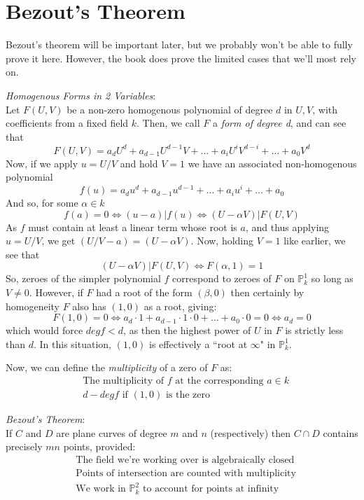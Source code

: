 \section{Bezout's Theorem}
Bezout's theorem will be important later, but we
probably won't be able to fully prove it here. However,
the book does prove the limited cases that we'll most rely on.

\begin{theorem}
\emph{Homogenous Forms in 2 Variables}:\\

Let $F(U,V)$ be a non-zero homogenous polynomial of degree $d$ in $U,V$,
with coefficients from a fixed field $k$. Then, we call $F$ a \emph{form of degree d},
and can see that
\[
F(U,V) = a_dU^d+a_{d-1}U^{d-1}V + \dots + a_iU^iV^{d-i}+\dots+a_0V^d
\]
Now, if we apply $u=U/V$ and hold $V=1$ we have an associated non-homogenous polynomial
\[
f(u) = a_du^d + a_{d-1}u^{d-1} + \dots + a_iu^i + \dots + a_0
\]
And so, for some $\alpha \in k$
\[ %
f(a) = 0 \iff (u-a)|f(u) \iff (U-\alpha V) | F(U,V)
\]
As $f$ must contain at least a linear term whose root is $a$, and
thus applying $u=U/V$, we get $(U/V - a) = (U - \alpha V)$. Now, 
holding $V=1$ like earlier, we see that
\[
(U-\alpha V) | F(U,V) \iff F(\alpha,1) = 1
\]
So, zeroes of the simpler polynomial $f$ correspond to zeroes of $F$
on $\mathbb{P}^1_k$ so long as $V \ne 0$. However, if $F$ had a root
of the form $(\beta,0)$ then certainly by homogeneity $F$ also has
$(1,0)$ as a root, giving:
\[
F(1,0) = 0 \iff a_d \cdot 1 + a_{d-1} \cdot 1 \cdot 0 + \dots + a_0 \cdot 0 = 0 \iff a_d = 0
\]
which would force $deg f < d$, as then the highest power of $U$ in $F$ is strictly
less than $d$. In this situation, $(1,0)$ is effectively a ``root at $\infty$" in $\mathbb{P}^1_k$.

Now, we can define the \emph{multiplicity} of a zero of $F$ as:
\begin{align*}
&\text{The multiplicity of $f$ at the corresponding $a \in k$}\\
&\text{$d - deg f$ if $(1,0)$ is the zero}
\end{align*}

\end{theorem}

\begin{theorem}
\emph{Bezout's Theorem}:\\

If $C$ and $D$ are plane curves of degree $m$ and $n$ (respectively)
then $C \cap D$ contains precisely $mn$ points, provided:
\begin{align*}
&\text{The field we're working over is algebraically closed} \tag{i}\\
&\text{Points of intersection are counted with multiplicity} \tag{ii}\\
&\text{We work in $\mathbb{P}^2_k$ to account for points at infinity} \tag{iii}\\
\end{align*}
\end{theorem}

